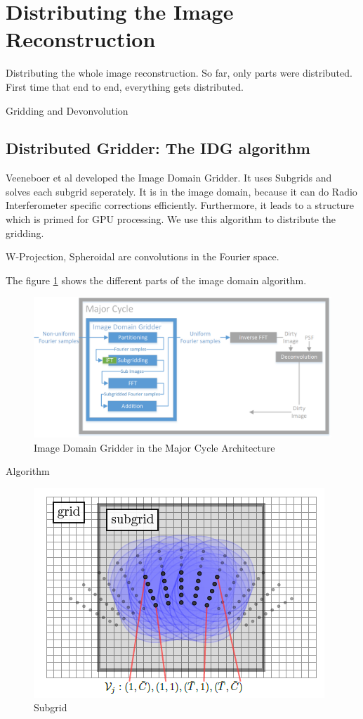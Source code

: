 \section{Distributing the Image Reconstruction}\label{distribution}
Distributing the whole image reconstruction. So far, only parts were distributed. First time that end to end, everything gets distributed.



Gridding and Devonvolution

\subsection{Distributed Gridder: The IDG algorithm}\label{distribution:idg}
Veeneboer et al\cite{veenboer2017image} developed the Image Domain Gridder. It uses Subgrids and solves each subgrid seperately.
It is in the image domain, because it can do Radio Interferometer specific corrections efficiently. Furthermore, it leads to a structure which is primed for GPU processing.
We use this algorithm to distribute the gridding.

W-Projection, Spheroidal are convolutions in the Fourier space.

The figure \ref{distribution:idg:system} shows the different parts of the image domain algorithm.

\begin{figure}[h]
	\centering
	\includegraphics[width=0.80\linewidth]{./chapters/03.distribution/idg/major-minor-idg.png}
	\caption{Image Domain Gridder in the Major Cycle Architecture}
	\label{distribution:idg:system}
\end{figure}

Algorithm
\begin{figure}[h]
	\centering
	\includegraphics[width=0.40\linewidth]{./chapters/03.distribution/idg/subgrid.png}
	\caption{Subgrid}
	\label{distribution:idg:subgrid}
\end{figure}

